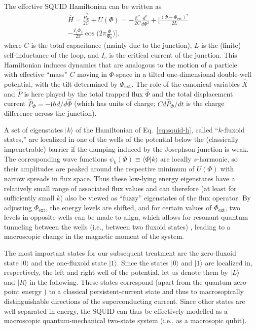 \documentclass[12pt,aps,floatfix,amsmath,amssymb,showpacs,nofootinbib]{revtex4-2}
\newcommand{\ket}[1]{\ensuremath{|{#1\rangle}}}
\newcommand{\braket}[2]{\ensuremath{{\langle #1}|{#2 \rangle}}}
\begin{document}
The effective SQUID Hamiltonian can be written as \cite{Weiss:1999:tv}
%
\begin{multline} \label{eq:squid-h}
\widehat{H} = \frac{\widehat{P}_\Phi^2}{2C} + U(\Phi) 
= - \frac{\hbar^2}{2C}
 \frac{d^2}{d\Phi^2} + \biggl[ \frac{(\Phi- 
  \Phi_\text{ext})^2}{2L} \\ - \frac{I_c \Phi_0}{2\pi} \cos \biggl(
2\pi \frac{\Phi}{\Phi_0} \biggr) \biggr],
\end{multline}
%
where $C$ is the total capacitance (mainly due to the junction), $L$
is the (finite) self-inductance of the loop, and $I_c$ is the critical
current of the junction. This Hamiltonian induces dynamics that are
analogous to the motion of a particle with effective ``mass'' $C$
moving in $\Phi$-space in a tilted one-dimensional double-well
potential, with the tilt determined by $\Phi_\text{ext}$. The role of
the canonical variables $\widehat{X}$ and $\widehat{P}$ is here played
by the total trapped flux $\widehat{\Phi}$ and the total displacement
current $\widehat{P}_\Phi = -\mathrm{i}\hbar d/d\widehat{\Phi}$ (which has
units of charge; $Cd\widehat{P}_\Phi / dt$ is the charge difference
across the junction).

A set of eigenstates $\ket{k}$ of the Hamiltonian of
Eq.~\eqref{eq:squid-h}, called ``$k$-fluxoid states,'' are localized
in one of the wells of the potential below the (classically
impenetrable) barrier if the damping induced by the Josephson junction
is weak. The corresponding wave functions $\psi_k(\Phi) \equiv
\braket{\Phi}{k}$ are locally $s$-harmonic, so their amplitudes are
peaked around the respective minimum of $U(\Phi)$ with narrow spreads
in flux space. Thus these low-lying energy eigenstates have a
relatively small range of associated flux values and can therefore (at
least for sufficiently small $k$) also be viewed as ``fuzzy''
eigenstates of the flux operator. By adjusting $\Phi_\text{ext}$, the
energy levels are shifted, and for certain values of
$\Phi_\text{ext}$, two levels in opposite wells can be made to align,
which allows for resonant quantum tunneling between the wells (i.e.,
between two fluxoid states) \cite{Silvestrini:1996:ii,Rouse:1998:om},
leading to a macroscopic change in the magnetic moment of the system.

The most important states for our subsequent treatment are the
zero-fluxoid state $\ket{0}$ and the one-fluxoid state $\ket{1}$.
Since the states $\ket{0}$ and $\ket{1}$ are localized in,
respectively, the left and right well of the potential, let us denote
them by $\ket{L}$ and $\ket{R}$ in the following. These states
correspond (apart from the quantum zero-point energy
\cite{Wal:2000:om}) to a classical persistent-current state and thus
to macrosopically distinguishable directions of the superconducting
current.  Since other states are well-separated in energy, the SQUID
can thus be effectively modelled as a macroscopic quantum-mechanical
two-state system (i.e., as a macrosopic qubit).
\end{document}
